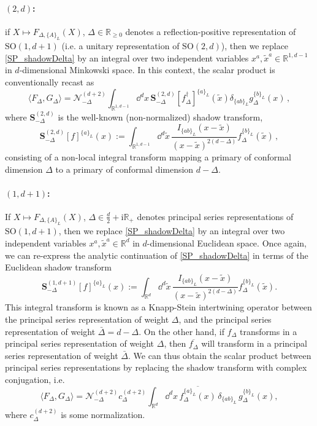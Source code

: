 \documentclass{article}
\def \Dg {\Delta}
\def \dg {\delta}
\def \Rs {\mathbb{R}}
\begin{document}
\paragraph{$(2,d)$:} if $X \mapsto F_{\Dg,\{A\}_L}(X)$, $\Dg \in \Rs_{\geq 0}$ denotes a reflection-positive representation of $\mathrm{SO}(1,d+1)$ (i.e. a unitary representation of $\mathrm{SO}(2,d)$), then we replace \eqref{SP_shadowDelta} by an integral over two independent variables $x^a,\tilde{x}^a \in \Rs^{1,d-1}$ in $d$-dimensional Minkowski space. In this context, the scalar product is conventionally recast as 
   \begin{equation}
\langle F_{\Dg}, G_{\Dg} \rangle = \mathcal{N}^{(d+2)}_{-\Dg} \int_{\Rs^{1,d-1}} \dd^d x \, \mathbf{S}_{-\Dg}^{(2,d)}[f_{\Dg}^{\dagger}]^{\{a\}_L} (\tilde{x}) \dg_{\{ab \}_L} g_{\Dg}^{\{b\}_L}(x)\,, 
\label{SP_lorentzian}
\end{equation}
   where $\mathbf{S}_{-\Dg}^{(2,d)}$ is the well-known (non-normalized) shadow transform,
   \begin{equation}
\mathbf{S}^{(2,d)}_{-\Dg}[f]^{\{a\}_L} (x) := \int_{\Rs^{1,d-1}}\dd^d \tilde{x}\, \frac{I_{\{ab\}_L}(x-\tilde{x})}{(x-\tilde{x})^{2(d-\Dg)}} f_{\Dg}^{\{b\}_L} (\tilde{x})\,,
\end{equation}
   consisting of a non-local integral transform mapping a primary of conformal dimension $\Dg$ to a primary of conformal dimension $d-\Dg$.
    
\paragraph{$(1,d+1)$:} If $X \mapsto F_{\Dg,\{A\}_L}(X)$, $\Dg \in \frac{d}{2} + \mathrm{i} \Rs_+$ denotes principal series representations of $\mathrm{SO}(1,d+1)$, then we replace \eqref{SP_shadowDelta} by an integral over two independent variables $x^a,\tilde{x}^a \in \Rs^{d}$ in $d$-dimensional Euclidean space. Once again, we can re-express the analytic continuation of \eqref{SP_shadowDelta} in terms of the Euclidean shadow transform
   \begin{equation}
\mathbf{S}^{(1,d+1)}_{-\Dg}[f]^{\{a\}_L} (x) := \int_{\Rs^{d}}\dd^d \tilde{x}\, \frac{I_{\{ab\}_L}(x-\tilde{x})}{(x-\tilde{x})^{2(d-\Dg)}} f_{\Dg}^{\{b\}_L} (\tilde{x}). 
\end{equation}
This integral transform is known as a Knapp-Stein intertwining operator \cite{Dobrev:1977qv} between the principal series representation of weight $\Delta$, and the principal series representation of weight $\bar{\Delta} = d-\Delta$. On the other hand, if $f_{\Delta}$ transforms in a principal series representation of weight $\Delta$, then $\overline{f_{\Delta}}$ will transform in a principal series representation of weight $\bar{\Delta}$. We can thus obtain the scalar product between principal series representations by replacing the shadow transform with complex conjugation, i.e.  
    \begin{equation}
        \langle F_{\Dg}, G_{\Dg}\rangle = \mathcal{N}_{-\Dg}^{(d+2)} c_{\Dg}^{(d+2)} \int_{\Rs^d} \dd^d x\, \overline{f_{\Delta}^{\{a\}_L}(x)}\, \dg_{\{ab\}_L}\, g_{\Dg}^{\{b\}_L}(x), 
        \end{equation}
        where $c_{\Delta}^{(d+2)}$ is some normalization.
        
\end{document}
